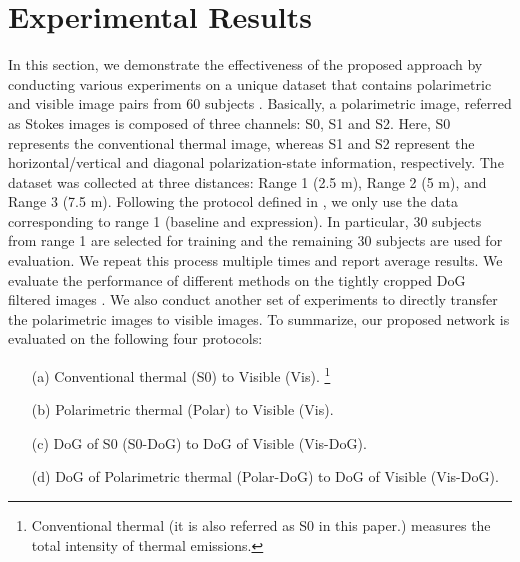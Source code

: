 \documentclass[10pt,twocolumn,letterpaper]{article}
\begin{document}
\section{Experimental Results}
In this section, we demonstrate the effectiveness of the proposed approach by conducting various experiments on a unique dataset that contains polarimetric and visible image pairs from 60 subjects  \cite{ijcb_datasets2}.  Basically, a polarimetric image, referred as  Stokes images is composed of three channels: S0, S1 and S2. Here, S0 represents the conventional thermal image, whereas S1 and S2 represent the horizontal/vertical and diagonal polarization-state information, respectively.  The dataset was collected at three distances: Range 1 (2.5 m), Range 2 (5 m), and Range 3 (7.5 m).   Following the protocol defined in  \cite{btas_2016}, we only use the data corresponding to range 1 (baseline and expression).   In particular, 30 subjects from range 1 are selected for training and the remaining 30 subjects are used for evaluation.  We repeat this process multiple times and report average results.  We evaluate the performance of different methods on the tightly cropped DoG filtered images \cite{btas_2016}.   We also conduct another set of experiments to directly transfer the polarimetric images to visible images. To summarize, our proposed network is evaluated on the following four protocols: 
\begin{enumerate}[nolistsep]
\item[(a)] Conventional thermal (S0) to Visible (Vis). \footnote{Conventional thermal (it is also referred as S0 in this paper.) measures the total intensity of thermal emissions.}
\item[(b)] Polarimetric thermal (Polar) to Visible (Vis).
\item[(c)] DoG of S0 (S0-DoG) to DoG of Visible (Vis-DoG).
\item[(d)] DoG of Polarimetric thermal (Polar-DoG) to DoG of Visible (Vis-DoG).
\end{enumerate}
\end{document}
